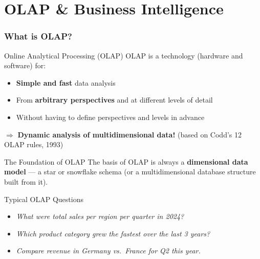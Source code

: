 \section{OLAP \& Business Intelligence}


\begin{frame}
  \frametitle{What is OLAP?}

  \begin{block}{Online Analytical Processing (OLAP)}
    OLAP is a technology (hardware and software) for:
    \begin{itemize}
      \item \textbf{Simple and fast} data analysis
      \item From \textbf{arbitrary perspectives} and at different levels of detail
      \item Without having to define perspectives and levels in advance
    \end{itemize}
    $\Rightarrow$ \textbf{Dynamic analysis of multidimensional data!}
    \hfill\small(based on Codd's 12 OLAP rules, 1993)
  \end{block}

  \begin{block}{The Foundation of OLAP}
    The basis of OLAP is always a \textbf{dimensional data model} ---
    a star or snowflake schema (or a multidimensional database structure
    built from it).
  \end{block}

  \begin{block}{Typical OLAP Questions}
    \begin{itemize}
      \item \textit{What were total sales per region per quarter in 2024?}
      \item \textit{Which product category grew the fastest over the last 3 years?}
      \item \textit{Compare revenue in Germany vs.\ France for Q2 this year.}
    \end{itemize}
  \end{block}
\end{frame}

